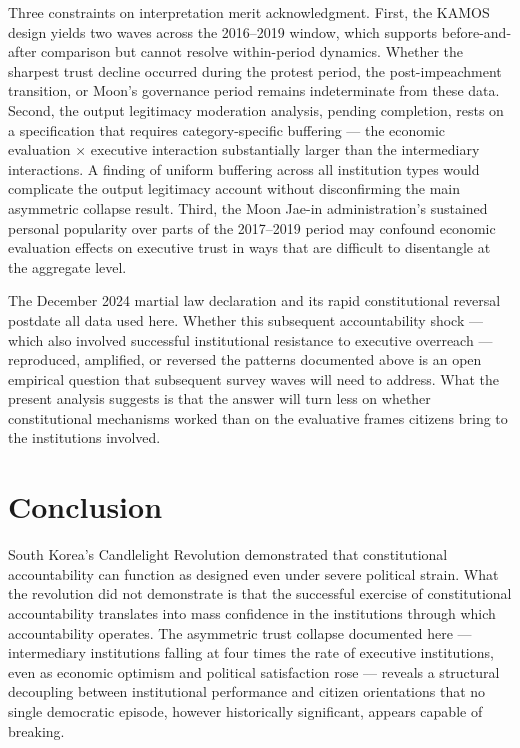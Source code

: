 \documentclass[
  12pt,
  letterpaper]{article}
\begin{document}
Three constraints on interpretation merit acknowledgment. First, the
KAMOS design yields two waves across the 2016--2019 window, which
supports before-and-after comparison but cannot resolve within-period
dynamics. Whether the sharpest trust decline occurred during the protest
period, the post-impeachment transition, or Moon's governance period
remains indeterminate from these data. Second, the output legitimacy
moderation analysis, pending completion, rests on a specification that
requires category-specific buffering --- the economic evaluation ×
executive interaction substantially larger than the intermediary
interactions. A finding of uniform buffering across all institution
types would complicate the output legitimacy account without
disconfirming the main asymmetric collapse result. Third, the Moon
Jae-in administration's sustained personal popularity over parts of the
2017--2019 period may confound economic evaluation effects on executive
trust in ways that are difficult to disentangle at the aggregate level.

The December 2024 martial law declaration and its rapid constitutional
reversal postdate all data used here. Whether this subsequent
accountability shock --- which also involved successful institutional
resistance to executive overreach --- reproduced, amplified, or reversed
the patterns documented above is an open empirical question that
subsequent survey waves will need to address. What the present analysis
suggests is that the answer will turn less on whether constitutional
mechanisms worked than on the evaluative frames citizens bring to the
institutions involved.

\section{Conclusion}\label{conclusion}

South Korea's Candlelight Revolution demonstrated that constitutional
accountability can function as designed even under severe political
strain. What the revolution did not demonstrate is that the successful
exercise of constitutional accountability translates into mass
confidence in the institutions through which accountability operates.
The asymmetric trust collapse documented here --- intermediary
institutions falling at four times the rate of executive institutions,
even as economic optimism and political satisfaction rose --- reveals a
structural decoupling between institutional performance and citizen
orientations that no single democratic episode, however historically
significant, appears capable of breaking.
\end{document}
